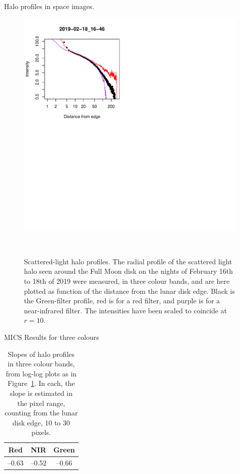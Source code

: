 \documentclass[final,hyperref={pdfpagelabels=false}]{beamer}
\begin{document}
\begin{frame}[t]
\begin{columns}[t]
\begin{column}{.23\textwidth}
\begin{block}{Halo profiles in space images.}
\begin{figure}
\includegraphics[scale=1.08,viewport=2 261 232 496,clip]{fig/slopes_compared_2019-02-18_16-46.pdf}
\caption{Scattered-light halo profiles. The radial profile of the scattered light halo seen around the Full Moon disk on the nights of February 16th to 18th of 2019 were measured, in three colour bands, and are here plotted as function of the distance from the lunar disk edge. Black is the Green-filter profile, red is for a red filter, and purple is for a near-infrared filter. The intensities have been scaled to coincide at $r=10$.}~\label{fig:3panelfig}
\end{figure}
\vspace{-1cm}
\end{block}


\begin{block}{MICS Results for three colours}
\begin{table}[]
    \centering
    \begin{tabular}{ccc}
    Red & NIR & Green \\
    \hline
         --0.63 & --0.52 & --0.66\\
         \hline
    \end{tabular}
    \caption{Slopes of halo profiles in three colour bands, from log-log plots as in Figure~\ref{fig:3panelfig}. In each, the slope is estimated in the pixel range, counting from the lunar disk edge, 10 to 30 pixels.}
    \label{tab:my_label}
\end{table}
\end{block}



\end{column}
\end{columns}
\end{frame}
\end{document}
